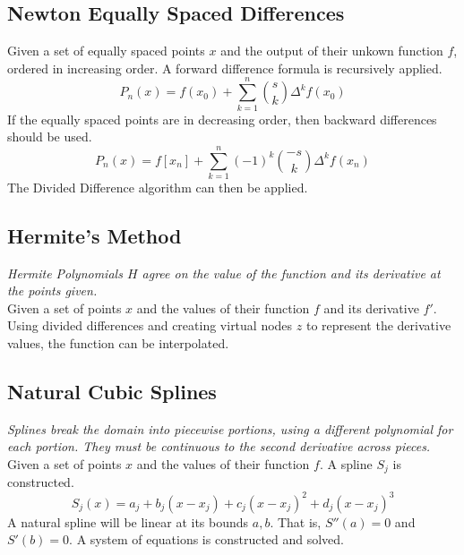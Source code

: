 \documentclass[10pt]{article}
\numberwithin{equation}{subsection}
\begin{document}
            

        \subsection{Newton Equally Spaced Differences}

            Given a set of equally spaced points $x$ and the output of their
            unkown function $f$, ordered in increasing order. A forward
            difference formula is recursively applied.
            $$P_n(x) = f(x_0) + \sum_{k=1}^n {s \choose k } \Delta^k f(x_0)$$
            If the equally spaced points are in decreasing order, then backward
            differences should be used.
            $$P_n(x) = f[x_n] + \sum_{k=1}^n (-1)^k {-s \choose k } \Delta^k f(x_n)$$
            The Divided Difference algorithm can then be applied.

        \subsection{Hermite's Method}

            \textit{Hermite Polynomials $H$ agree on the value of the function and
            its derivative at the points given.}\\

            Given a set of points $x$ and the values of their function $f$ and
            its derivative $f'$. Using divided differences and creating virtual
            nodes $z$ to represent the derivative values, the function can be
            interpolated.\\

            

        \subsection{Natural Cubic Splines}

            \textit{Splines break the domain into piecewise portions, using
            a different polynomial for each portion. They must be continuous
            to the second derivative across pieces.}\\

            Given a set of points $x$ and the values of their function $f$. A
            spline $S_j$ is constructed.
            $$S_j(x) = a_j + b_j(x-x_j) + c_j(x-x_j)^2 + d_j(x-x_j)^3$$
            A natural spline will be linear at its bounds $a, b$. That is,
            $S''(a) = 0$ and $S'(b) = 0$. A system of equations is constructed
            and solved.\\
\end{document}
